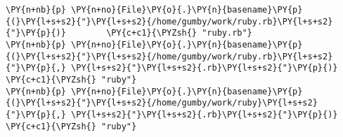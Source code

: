 \begin{Verbatim}[commandchars=\\\{\}]
\PY{n+nb}{p} \PY{n+no}{File}\PY{o}{.}\PY{n}{basename}\PY{p}{(}\PY{l+s+s2}{"}\PY{l+s+s2}{/home/gumby/work/ruby.rb}\PY{l+s+s2}{"}\PY{p}{)}        \PY{c+c1}{\PYZsh{} "ruby.rb"}
\PY{n+nb}{p} \PY{n+no}{File}\PY{o}{.}\PY{n}{basename}\PY{p}{(}\PY{l+s+s2}{"}\PY{l+s+s2}{/home/gumby/work/ruby.rb}\PY{l+s+s2}{"}\PY{p}{,} \PY{l+s+s2}{"}\PY{l+s+s2}{.rb}\PY{l+s+s2}{"}\PY{p}{)} \PY{c+c1}{\PYZsh{} "ruby"}
\PY{n+nb}{p} \PY{n+no}{File}\PY{o}{.}\PY{n}{basename}\PY{p}{(}\PY{l+s+s2}{"}\PY{l+s+s2}{/home/gumby/work/ruby}\PY{l+s+s2}{"}\PY{p}{,} \PY{l+s+s2}{"}\PY{l+s+s2}{.rb}\PY{l+s+s2}{"}\PY{p}{)}    \PY{c+c1}{\PYZsh{} "ruby"}
\end{Verbatim}
